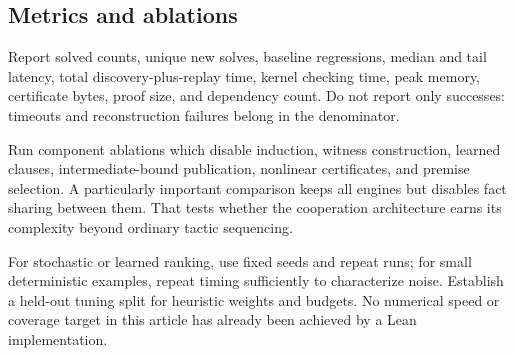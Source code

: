 \documentclass[11pt,letterpaper]{article}
\theoremstyle{definition}\newtheorem{definition}[proposition]{Definition}
\begin{document}
\subsection{Metrics and ablations}
Report solved counts, unique new solves, baseline regressions, median and tail latency, total discovery-plus-replay time, kernel checking time, peak memory, certificate bytes, proof size, and dependency count. Do not report only successes: timeouts and reconstruction failures belong in the denominator.

Run component ablations which disable induction, witness construction, learned clauses, intermediate-bound publication, nonlinear certificates, and premise selection. A particularly important comparison keeps all engines but disables fact sharing between them. That tests whether the cooperation architecture earns its complexity beyond ordinary tactic sequencing.

For stochastic or learned ranking, use fixed seeds and repeat runs; for small deterministic examples, repeat timing sufficiently to characterize noise. Establish a held-out tuning split for heuristic weights and budgets. No numerical speed or coverage target in this article has already been achieved by a Lean implementation.

\end{document}
